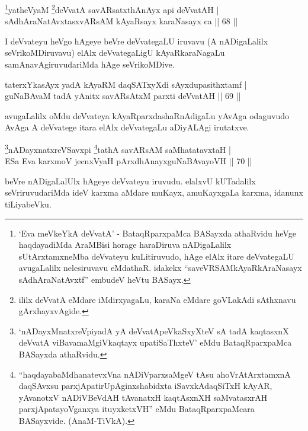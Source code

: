 \begin{shl}
\footnote{`Eva meVkeYkA deVvatA' - BataqRparxpaMca BASayxda athaRvidu heVge haqdayadiMda AraMBisi horage haraDiruva nADigaLalilx sUtArxtamxneMba deVvateyu kuLitiruvudo, hAge elAlx itare deVvategaLU avugaLalilx nelesiruvavu eMdathaR. idakekx ``saveVRSAMkAyaRkAraNasayx sAdhAraNatAvxtf'' embudeV heVtu BASayx.}yatheVyaM \footnote{ililx deVvatA eMdare iMdirxyagaLu, karaNa eMdare goVLakAdi sAthxnavu gArxhayxvAgide.}deVvatA savARsatxthA\s nAyx api deVvatAH |\\
sAdhAraNatAvxtasxvARsAM kAyaRsayx karaNasayx ca \hfill || 68 || 
\end{shl}

\begin{artha}
 I deVvateyu heVgo hAgeye beVre deVvategaLU iruvavu (A nADigaLalilx seVrikoMDiruvavu) elAlx deVvategaLigU kAyaRkaraNagaLu samAnavAgiruvudariMda hAge seVrikoMDive.
\end{artha}

\begin{shl}
taterxYkasAyx yadA kAyaRM daqSATxyXdi sAyxdupasithxtamf |\\
guNaBAvaM tadA yAnitx savARsAtxM parxti deVvatAH \hfill || 69 || 
\end{shl}

\begin{artha}
avugaLalilx oMdu deVvateya kAyaRparxdashaRnAdigaLu yAvAga odaguvudo AvAga A deVvatege itara elAlx deVvategaLu aDiyALAgi irutatxve.
\end{artha}


\begin{shl}
\footnote{`nADayxMnatxreV\s piyadA yA deVvatA\s peVkaSxyXteV sA tadA kaqtasxnX deVvatA viBavamaMgiVkaqtayx upatiSaThxteV' eMdu BataqRparxpaMca BASayxda athaRvidu.}nADayxnatxreVSavxpi \footnote{``haqdayabaMdhanatevxVna nADiVparxsaMgeV tAsu ahoVrAtArxtamxnA daqSAvxsu parxjApatirUpAginxshabidxta iSavxkAdaqSiTxH kAyAR, yAvanotxV nADiVBeVdAH tAvanatxH kaqtAsxnXH saMvatasxrAH parxjApatayoV\s ganxya ituyxketxVH'' eMdu BataqRparxpaMcara BASayxvide. (AnaM-TiVkA).}tathA savARsAM saMhatatavxtaH |\\
ESa Eva karxmoV jecnxVyaH pArxdhAnayxguNaBAvayoVH \hfill || 70 || 
\end{shl}


\begin{artha}
 beVre nADigaLalUlx hAgeye deVvateyu iruvudu. elalxvU kUTadalilx seVriruvudariMda ideV karxma aMdare muKayx, amuKayxgaLa karxma, idanunx tiLiyabeVku.
\end{artha}

